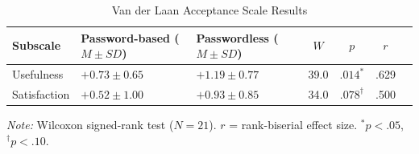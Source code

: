 ﻿%
\begin{table}[H]
    \centering
    \begin{threeparttable}
        \caption{Van der Laan Acceptance Scale Results}
        \label{tab:vdl-results}
        \begin{tabular}{@{}p{1.85cm}p{2.45cm}p{2.45cm}cccc@{}}
            \toprule
            \textbf{Subscale} & \textbf{Password-based ($M \pm SD$)} & \textbf{Passwordless ($M \pm SD$)} & \textbf{$W$} & \textbf{$p$} & \textbf{$r$} \\
            \midrule
            Usefulness   & $+0.73 \pm 0.65$ & $+1.19 \pm 0.77$ & 39.0 & $.014^{*}$ & .629 \\
            Satisfaction & $+0.52 \pm 1.00$ & $+0.93 \pm 0.85$ & 34.0 & $.078^{\dagger}$ & .500 \\
            \bottomrule
        \end{tabular}
        \begin{tablenotes}
            \small
            \item \textit{Note:} Wilcoxon signed-rank test ($N = 21$). $r$ = rank-biserial effect size. $^{*} p < .05$, $^{\dagger} p < .10$.
        \end{tablenotes}
    \end{threeparttable}
\end{table}

